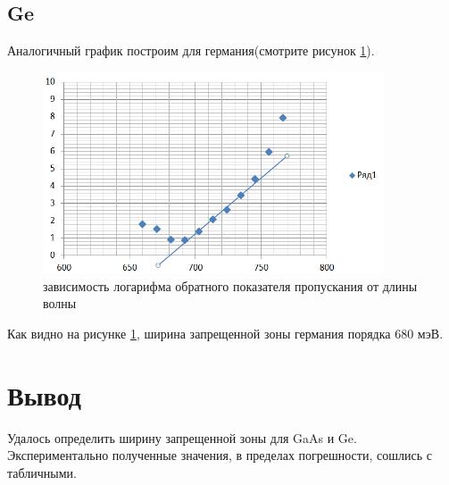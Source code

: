 \documentclass[a4paper, 12pt]{extarticle}
\begin{document}
\subsection*{\textcolor{sub_header}{Ge}}

Аналогичный график построим для германия(смотрите рисунок \ref{fig:Ge}).

\begin{figure}[htbp]
    \centering
    \includegraphics*[width = 0.9\textwidth]{main_2.png}
    \caption{зависимость логарифма обратного показателя пропускания от длины волны}
    \label{fig:Ge}
\end{figure}

Как видно на рисунке \ref{fig:Ge}, ширина запрещенной зоны германия порядка $680 \text{ мэВ}$.


\section*{\textcolor{header}{Вывод}}
 Удалось определить ширину запрещенной зоны для GaAs и Ge. Экспериментально полученные значения, в пределах погрешности, сошлись с табличными. 
\end{document}
